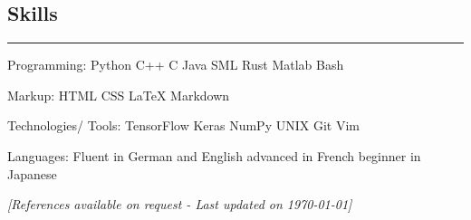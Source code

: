 \documentclass[10pt,letterpaper]{article}
\begin{document}
\subsection*{Skills}
\hrule
\vspace{0.4em}
\begin{description*}
	\item[Programming:]
	Python \textbullet{} C++ \textbullet{} C \textbullet{} Java \textbullet{} SML \textbullet{} Rust \textbullet{} Matlab \textbullet{} Bash
    \item[Markup:]
    HTML  \textbullet{} CSS  \textbullet{} \LaTeX  \textbullet{} Markdown
	\item[Technologies/ Tools:]
	TensorFlow  \textbullet{} Keras  \textbullet{} NumPy  \textbullet{} UNIX  \textbullet{} Git  \textbullet{} Vim
	\item[Languages:]
	Fluent in German and English  \textbullet{} advanced in French  \textbullet{} beginner in Japanese
\end{description*}

% 
% 

\hfill \small \textit{[References available on request - Last updated on \today]}
\end{document}
